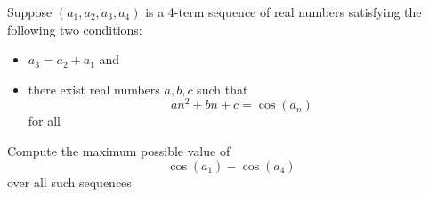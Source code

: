 Suppose $(a_1,a_2,a_3,a_4)$ is a 4-term sequence of real numbers satisfying the following two conditions:
\begin{itemize}
	\item $a_3=a_2+a_1$ and 
	\item there exist real numbers $a,b,c$ such that \[an^2+bn+c=\cos(a_n)\] for all 
\end{itemize}
Compute the maximum possible value of \[\cos(a_1)-\cos(a_4)\] over all such sequences 